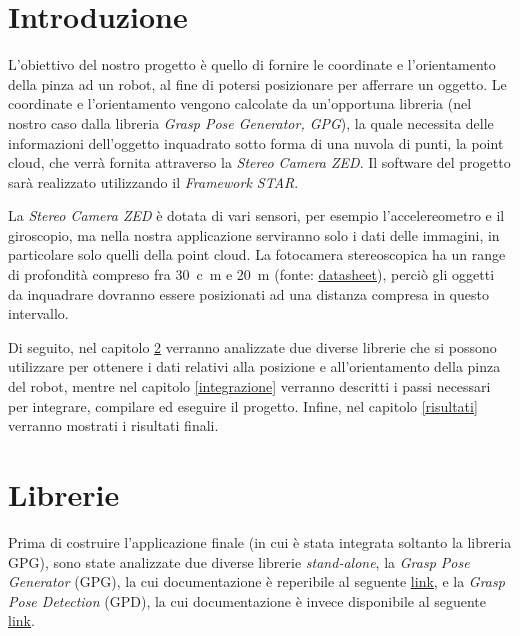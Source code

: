 \documentclass{report}
\begin{document}
\chapter{Introduzione}
L'obiettivo del nostro progetto è quello di fornire le coordinate e l'orientamento della pinza ad un robot, al fine di potersi posizionare per afferrare un oggetto. Le coordinate e l'orientamento vengono calcolate da un'opportuna libreria (nel nostro caso dalla libreria \textit{Grasp Pose Generator, GPG}), la quale necessita delle informazioni dell'oggetto inquadrato sotto forma di una nuvola di punti, la point cloud, che verrà fornita attraverso la \textit{Stereo Camera ZED}. Il software del progetto sarà realizzato utilizzando il \textit{Framework STAR}. \par
La \textit{Stereo Camera ZED} è dotata di vari sensori, per esempio l'accelereometro e il giroscopio, ma nella nostra applicazione serviranno solo i dati delle immagini, in particolare solo quelli della point cloud. La fotocamera stereoscopica ha un range di profondità compreso fra \SI{30}{c\meter} e \SI{20}{\meter} (fonte: \textcolor{blue}{\underline{\href{https://www.stereolabs.com/assets/datasheets/zed2-camera-datasheet.pdf}{datasheet}}}), perciò gli oggetti da inquadrare dovranno essere posizionati ad una distanza compresa in questo intervallo. \par
Di seguito, nel capitolo \ref{librerie} verranno analizzate due diverse librerie che si possono utilizzare per ottenere i dati relativi alla posizione e all'orientamento della pinza del robot, mentre nel capitolo \ref{integrazione} verranno descritti i passi necessari per integrare, compilare ed eseguire il progetto. Infine, nel capitolo \ref{risultati} verranno mostrati i risultati finali.
\newpage
\chapter{Librerie}\label{librerie}
Prima di costruire l'applicazione finale (in cui è stata integrata soltanto la libreria GPG), sono state analizzate due diverse librerie \textit{stand-alone}, la \textit{Grasp Pose Generator} (GPG), la cui documentazione è reperibile al seguente \textcolor{blue}{\underline{\href{https://github.com/atenpas/gpg}{link}}}, e la \textit{Grasp Pose Detection} (GPD), la cui documentazione è invece disponibile al seguente \textcolor{blue}{\underline{\href{https://github.com/atenpas/gpd}{link}}}.\par
\end{document}
